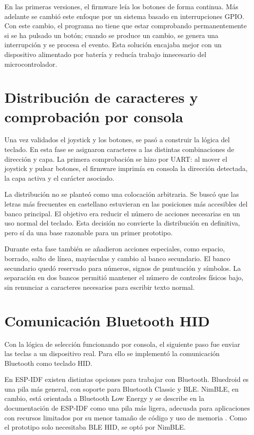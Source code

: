 En las primeras versiones, el firmware leía los botones de forma continua. Más adelante se cambió este enfoque por un sistema basado en interrupciones GPIO. Con este cambio, el programa no tiene que estar comprobando permanentemente si se ha pulsado un botón; cuando se produce un cambio, se genera una interrupción y se procesa el evento. Esta solución encajaba mejor con un dispositivo alimentado por batería y reducía trabajo innecesario del microcontrolador.

\section{Distribución de caracteres y comprobación por consola}
\label{sec:distribucion-resultados}

Una vez validados el joystick y los botones, se pasó a construir la lógica del teclado. En esta fase se asignaron caracteres a las distintas combinaciones de dirección y capa. La primera comprobación se hizo por UART: al mover el joystick y pulsar botones, el firmware imprimía en consola la dirección detectada, la capa activa y el carácter asociado.

La distribución no se planteó como una colocación arbitraria. Se buscó que las letras más frecuentes en castellano estuvieran en las posiciones más accesibles del banco principal. El objetivo era reducir el número de acciones necesarias en un uso normal del teclado. Esta decisión no convierte la distribución en definitiva, pero sí da una base razonable para un primer prototipo.

Durante esta fase también se añadieron acciones especiales, como espacio, borrado, salto de línea, mayúsculas y cambio al banco secundario. El banco secundario quedó reservado para números, signos de puntuación y símbolos. La separación en dos bancos permitió mantener el número de controles físicos bajo, sin renunciar a caracteres necesarios para escribir texto normal.

\section{Comunicación Bluetooth HID}
\label{sec:resultado-bluetooth-hid}

Con la lógica de selección funcionando por consola, el siguiente paso fue enviar las teclas a un dispositivo real. Para ello se implementó la comunicación Bluetooth como teclado HID.

En ESP-IDF existen distintas opciones para trabajar con Bluetooth. Bluedroid es una pila más general, con soporte para Bluetooth Classic y BLE. NimBLE, en cambio, está orientada a Bluetooth Low Energy y se describe en la documentación de ESP-IDF como una pila más ligera, adecuada para aplicaciones con recursos limitados por su menor tamaño de código y uso de memoria \cite{espressifBluetoothApi}. Como el prototipo solo necesitaba BLE HID, se optó por NimBLE.

